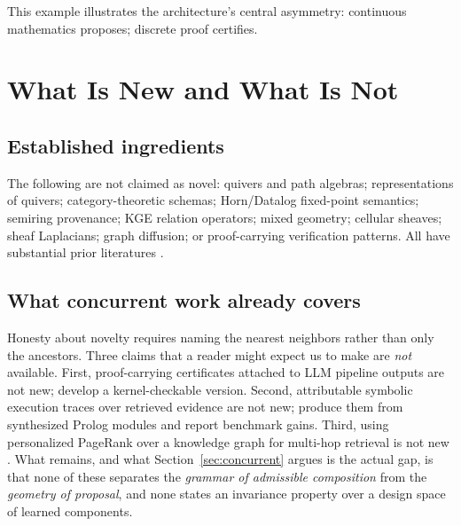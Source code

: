 \documentclass[11pt]{article}
\begin{document}
This example illustrates the architecture's central asymmetry: continuous mathematics proposes; discrete proof certifies.

\section{What Is New and What Is Not}

\subsection{Established ingredients}
The following are not claimed as novel: quivers and path algebras; representations of quivers; category-theoretic schemas; Horn/Datalog fixed-point semantics; semiring provenance; KGE relation operators; mixed geometry; cellular sheaves; sheaf Laplacians; graph diffusion; or proof-carrying verification patterns. All have substantial prior literatures \citep{spivak2012,green2007,necula1997,gebhart2023,ganev2022,abiteboul1995,hansen2019spectral,jeh2003}.

\subsection{What concurrent work already covers}
Honesty about novelty requires naming the nearest neighbors rather than only the ancestors. Three claims that a reader might expect us to make are \emph{not} available. First, proof-carrying certificates attached to LLM pipeline outputs are not new; \citet{koomullil2026} develop a kernel-checkable version. Second, attributable symbolic execution traces over retrieved evidence are not new; \citet{gann2026} produce them from synthesized Prolog modules and report benchmark gains. Third, using personalized PageRank over a knowledge graph for multi-hop retrieval is not new \citep{gutierrez2024}. What remains, and what Section~\ref{sec:concurrent} argues is the actual gap, is that none of these separates the \emph{grammar of admissible composition} from the \emph{geometry of proposal}, and none states an invariance property over a design space of learned components.
\end{document}
